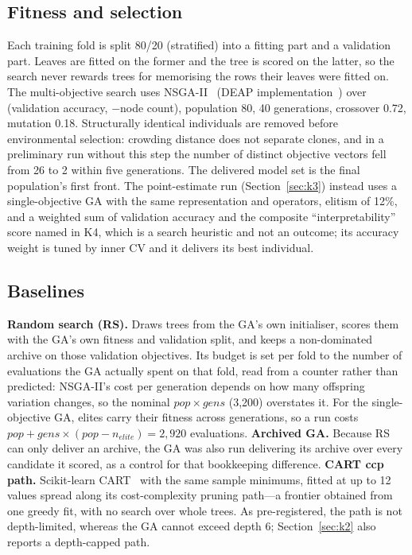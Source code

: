 \documentclass[sigconf,review,anonymous]{acmart}
\newcommand{\GA}{GA\xspace}
\newcommand{\RS}{RS\xspace}
\begin{document}
\subsection{Fitness and selection}
Each training fold is split 80/20 (stratified) into a fitting part and a validation part.
Leaves are fitted on the former and the tree is scored on the latter, so the search never
rewards trees for memorising the rows their leaves were fitted on. The multi-objective search uses NSGA-II~\cite{deb2002} (DEAP
implementation~\cite{fortin2012}) over (validation accuracy, $-$node count), population
80, 40 generations, crossover 0.72, mutation 0.18. Structurally identical individuals
are removed before environmental selection: crowding distance does not separate clones,
and in a preliminary run without this step the number of distinct objective vectors fell
from 26 to 2 within five generations. The delivered model set is the final population's
first front. The point-estimate run (Section~\ref{sec:k3}) instead uses a single-objective
\GA{} with the same representation and operators, elitism of 12\%, and a weighted sum of
validation accuracy and the composite ``interpretability'' score named in K4, which is a
search heuristic and not an outcome; its accuracy
weight is tuned by inner CV and it delivers its best individual.

\subsection{Baselines}
\textbf{Random search (\RS).} Draws trees from the \GA's own initialiser, scores them with
the \GA's own fitness and validation split, and keeps a non-dominated archive on those
validation objectives. Its budget is set per fold to the number of evaluations the \GA
actually spent on that fold, read from a counter rather than predicted: NSGA-II's cost
per generation depends on how many offspring variation changes, so the nominal
$\mathit{pop}\times\mathit{gens}$ (3{,}200) overstates it. For the single-objective \GA,
elites carry their fitness across generations, so a run costs
$\mathit{pop}+\mathit{gens}\times(\mathit{pop}-n_\mathit{elite})=2{,}920$ evaluations. \textbf{Archived \GA.} Because \RS{} can only deliver an archive, the \GA was
also run delivering its archive over every candidate it scored, as a control for that
bookkeeping difference. \textbf{CART ccp path.} Scikit-learn CART~\cite{pedregosa2011}
with the same sample minimums, fitted at up to 12 values spread along its
cost-complexity pruning path---a frontier obtained from one greedy fit, with no search
over whole trees. As
pre-registered, the path is not depth-limited, whereas the \GA cannot exceed depth 6;
Section~\ref{sec:k2} also reports a depth-capped path.
\end{document}
